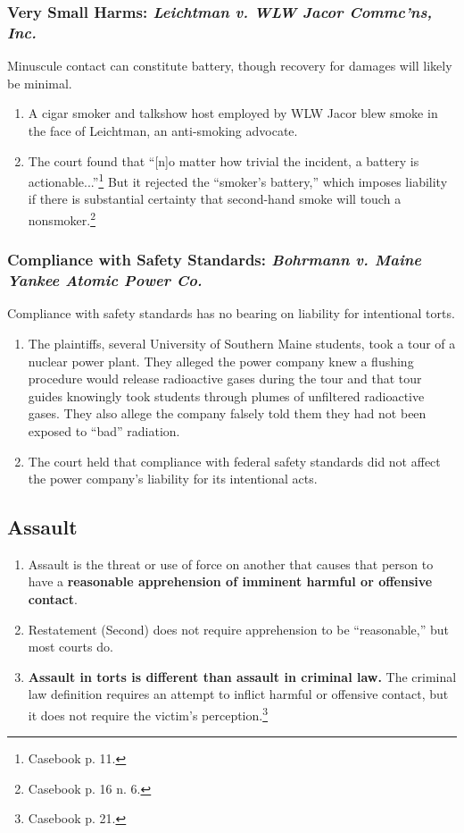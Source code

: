 \subsubsection{Very Small Harms: \emph{Leichtman v. WLW Jacor Commc'ns, Inc.}}

Minuscule contact can constitute battery, though recovery for damages will 
likely be minimal.

\begin{enumerate}
    \item A cigar smoker and talkshow host employed by WLW Jacor blew smoke in 
    the face of Leichtman, an anti-smoking advocate.
    \item The court found that ``[n]o matter how trivial the incident, a 
    battery is actionable...''\footnote{Casebook p. 11.} But it rejected the 
    ``smoker's battery,'' which imposes liability if there is substantial 
    certainty that second-hand smoke will touch a nonsmoker.\footnote{Casebook 
    p. 16 n. 6.}
\end{enumerate}

\subsubsection{Compliance with Safety Standards: \emph{Bohrmann 
v. Maine Yankee Atomic Power Co.}}

Compliance with safety standards has no bearing on liability for intentional 
torts.

\begin{enumerate}
    \item The plaintiffs, several University of Southern Maine students, took 
    a tour of a nuclear power plant. They alleged the power company knew a 
    flushing procedure would release radioactive gases during the tour and 
    that tour guides knowingly took students through plumes of unfiltered 
    radioactive gases. They also allege the company falsely told them they had 
    not been exposed to ``bad'' radiation.
    \item The court held that compliance with federal safety standards did not 
    affect the power company's liability for its intentional acts.
\end{enumerate}

\subsection{Assault}

\begin{enumerate}
    \item Assault is the threat or use of force on another that causes that 
    person to have a \textbf{reasonable apprehension of imminent harmful or 
    offensive contact}.
    \item Restatement (Second) does not require apprehension to be 
    ``reasonable,'' but most courts do.
    \item \textbf{Assault in torts is different than assault in criminal law.} 
    The criminal law definition requires an attempt to inflict harmful or 
    offensive contact, but it does not require the victim's 
    perception.\footnote{Casebook p. 21.}
\end{enumerate}


